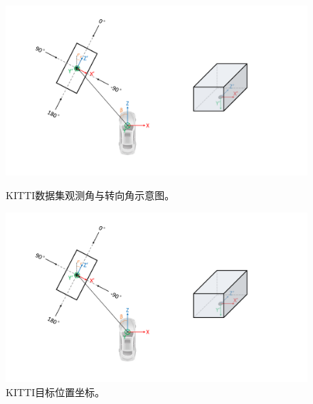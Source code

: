 \begin{figure}[!t]
	\centering
	\begin{minipage}[t]{0.55\textwidth}
		\centering
		\includegraphics[trim={2.5cm, 2cm, 15cm, 1cm}, clip,width=\textwidth]{./imgs/KITTI_obj.pdf}
		\caption{KITTI数据集观测角与转向角示意图。}
		\label{fig:kitti_obj}
	\end{minipage}
	\begin{minipage}[t]{0.42\textwidth}
		\centering
		\includegraphics[trim={20cm, 5cm, 5cm, 5cm}, clip,width=\textwidth]{./imgs/KITTI_obj.pdf}
		\caption{KITTI目标位置坐标。}
		\label{fig:kitti_box3d}
	\end{minipage}
\end{figure}
